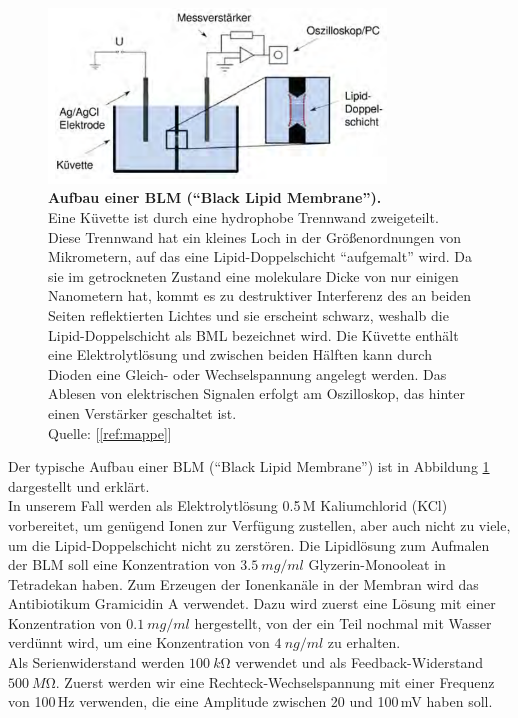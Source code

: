 \documentclass[a4paper,ngerman]{scrartcl}
\begin{document}
\begin{figure}[tb!]
  \centering
  \includegraphics[width=0.8\textwidth]{abbildungen/blmaufbau.png}
  \caption{\textbf{Aufbau einer BLM ("`Black Lipid Membrane"').} \\Eine Küvette ist durch eine hydrophobe Trennwand zweigeteilt. Diese Trennwand hat ein kleines Loch in der Größenordnungen von Mikrometern, auf das eine Lipid-Doppelschicht "`aufgemalt"' wird. Da sie im getrockneten Zustand eine molekulare Dicke von nur einigen Nanometern hat, kommt es zu destruktiver Interferenz des an beiden Seiten reflektierten Lichtes und sie erscheint schwarz, weshalb die Lipid-Doppelschicht als BML bezeichnet wird. Die Küvette enthält eine Elektrolytlösung und zwischen beiden Hälften kann durch Dioden eine Gleich- oder Wechselspannung angelegt werden. Das Ablesen von elektrischen Signalen erfolgt am Oszilloskop, das hinter einen Verstärker geschaltet ist.\\Quelle: [\ref{ref:mappe}]}
  \label{fig:blmaufbau}
\end{figure}

Der typische Aufbau einer BLM ("`Black Lipid Membrane"') ist in Abbildung \ref{fig:blmaufbau} dargestellt und erklärt. \\

In unserem Fall werden als Elektrolytlösung 0.5\,M Kaliumchlorid (KCl) vorbereitet, um genügend Ionen zur Verfügung zustellen, aber auch nicht zu viele, um die Lipid-Doppelschicht nicht zu zerstören. Die Lipidlösung zum Aufmalen der BLM soll eine Konzentration von 
$\SI{3,5}{mg/ml}$ Glyzerin-Monooleat in Tetradekan haben. Zum Erzeugen der Ionenkanäle in der Membran wird das Antibiotikum Gramicidin A verwendet. Dazu wird zuerst eine
Lösung mit einer Konzentration von $\SI{0,1}{mg/ml}$ hergestellt, von der ein Teil nochmal mit Wasser verdünnt wird, um eine Konzentration von
$\SI{4}{ng/ml}$ zu erhalten. \\

Als Serienwiderstand werden $\SI{100}{k\ohm}$ verwendet und als Feedback-Widerstand $\SI{500}{M\ohm}$. Zuerst werden wir eine 
Rechteck-Wechselspannung mit einer Frequenz von 100\,Hz verwenden, die eine Amplitude zwischen 20 und 100\,mV haben soll. \\
\end{document}
